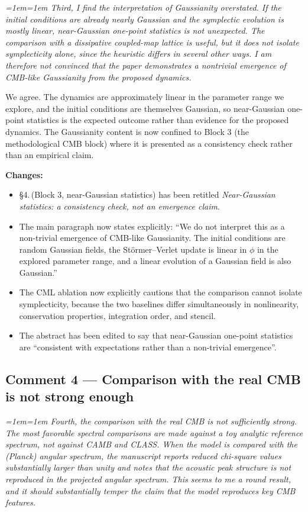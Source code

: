 \documentclass[12pt,a4paper]{article}
\newenvironment{review}{\par\color{revcolor}\itshape\leftskip=1em\rightskip=1em\noindent}{\par}
\begin{document}
\begin{review}
\textit{Third, I find the interpretation of Gaussianity overstated. If the initial conditions are already nearly Gaussian and the symplectic evolution is mostly linear, near-Gaussian one-point statistics is not unexpected. The comparison with a dissipative coupled-map lattice is useful, but it does not isolate symplecticity alone, since the heuristic differs in several other ways. I am therefore not convinced that the paper demonstrates a nontrivial emergence of CMB-like Gaussianity from the proposed dynamics.}
\end{review}

We agree.
The dynamics are approximately linear in the parameter range we explore, and the initial conditions are themselves Gaussian, so near-Gaussian one-point statistics is the expected outcome rather than evidence for the proposed dynamics.
The Gaussianity content is now confined to Block 3 (the methodological CMB block) where it is presented as a consistency check rather than an empirical claim.

\textbf{Changes:}
\begin{itemize}[leftmargin=2em]
  \item §4.\,(Block 3, near-Gaussian statistics) has been retitled \textit{Near-Gaussian statistics: a consistency check, not an emergence claim}.
  \item The main paragraph now states explicitly: ``We do not interpret this as a non-trivial emergence of CMB-like Gaussianity. The initial conditions are random Gaussian fields, the St\"ormer--Verlet update is linear in $\phi$ in the explored parameter range, and a linear evolution of a Gaussian field is also Gaussian.''
  \item The CML ablation now explicitly cautions that the comparison cannot isolate symplecticity, because the two baselines differ simultaneously in nonlinearity, conservation properties, integration order, and stencil.
  \item The abstract has been edited to say that near-Gaussian one-point statistics are ``consistent with expectations rather than a non-trivial emergence''.
\end{itemize}

\subsection*{Comment 4 --- Comparison with the real CMB is not strong enough}

\begin{review}
\textit{Fourth, the comparison with the real CMB is not sufficiently strong. The most favorable spectral comparisons are made against a toy analytic reference spectrum, not against CAMB and CLASS. When the model is compared with the (Planck) angular spectrum, the manuscript reports reduced chi-square values substantially larger than unity and notes that the acoustic peak structure is not reproduced in the projected angular spectrum. This seems to me a round result, and it should substantially temper the claim that the model reproduces key CMB features.}
\end{review}
\end{document}
